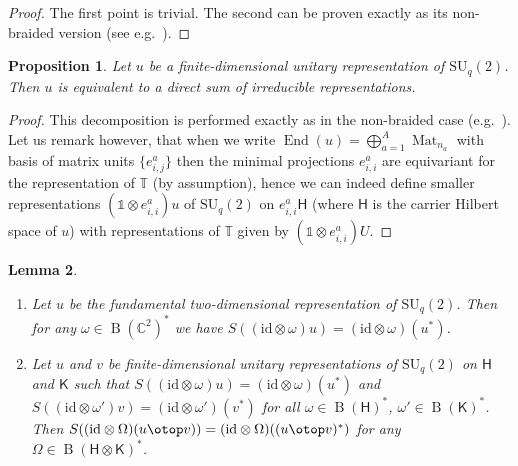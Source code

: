 \documentclass[12pt,reqno,a4paper]{amsart}
\newtheorem{proposition}{Proposition}[section]
\newtheorem{lemma}[proposition]{Lemma}
\theoremstyle{definition}
\newcommand{\I}{\mathds{1}}
\newcommand{\id}{\mathrm{id}}
\newcommand{\tens}{\otimes}
\newcommand{\CC}{\mathbb{C}}
\newcommand{\TT}{\mathbb{T}}
\newcommand{\sH}{\mathsf{H}}
\newcommand{\sK}{\mathsf{K}}
\DeclareMathOperator{\B}{B}
\DeclareMathOperator{\End}{End}
\newcommand{\SU}{\mathrm{SU}}
\numberwithin{equation}{section}
\begin{document}
\begin{proof}
The first point is trivial. The second can be proven exactly as its non-braided version (see e.g.~\cite[Proposition 1.3.4]{NeshveyevTuset}).
\end{proof}

\begin{proposition}\label{prop-lemma24}
Let $u$ be a finite-dimensional unitary representation of $\SU_q(2)$. Then $u$ is equivalent to a direct sum of irreducible representations.
\end{proposition}

\begin{proof}
This decomposition is performed exactly as in the non-braided case (e.g.~\cite[Theorem 1.3.7]{NeshveyevTuset}). Let us remark however, that when we write $\End(u)=\bigoplus_{a=1}^{A}\operatorname{Mat}_{n_a}$ with basis of matrix units $\{e^a_{i,j}\}$ then the minimal projections $e^a_{i,i}$ are equivariant for the representation of $\TT$ (by assumption), hence we can indeed define smaller representations $(\I\tens e^a_{i,i})u$ of $\SU_q(2)$ on $e^a_{i,i}\sH$ (where $\sH$ is the carrier Hilbert space of $u$) with representations of $\TT$ given by $(\I\tens e^a_{i,i})U$.
\end{proof}

\begin{lemma}\label{lem-lemma14}
\hspace*{\fill}
\begin{enumerate}
\item\label{lem-lemma14-1} Let $u$ be the fundamental two-dimensional representation of $\SU_q(2)$. Then for any $\omega\in\B(\CC^2)^*$ we have $S((\id\tens\omega)u)=(\id\tens\omega)(u^*)$.
\item Let $u$ and $v$ be finite-dimensional unitary representations of $\SU_q(2)$ on $\sH$ and $\sK$ such that $S((\id\tens\omega)u)=(\id\tens\omega)(u^*)$ and $S((\id\tens\omega')v)=(\id\tens\omega')(v^*)$ for all $\omega\in\B(\sH)^*$, $\omega'\in\B(\sK)^*$. Then $S((\id\tens\Omega)(u\otop v))=(\id\tens\Omega)((u\otop v)^*)$ for any $\Omega\in\B(\sH\tens\sK)^*$.
\end{enumerate}
\end{lemma}
\end{document}
